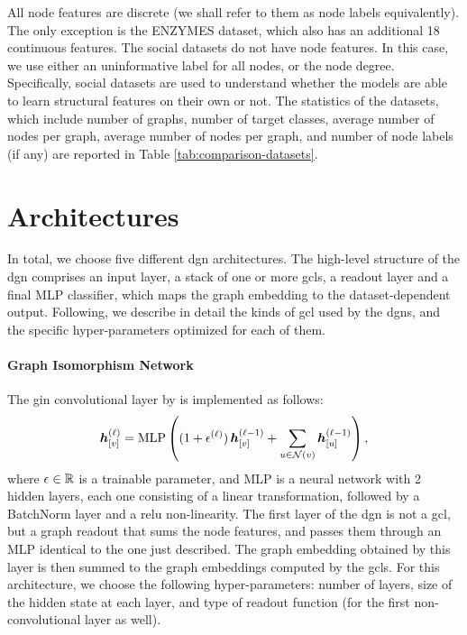 All node features are discrete (we shall refer to them as node labels equivalently). The only exception is the ENZYMES dataset, which also has an additional 18 continuous features. The social datasets do not have node features. In this case, we use either an uninformative label for all nodes, or the node degree. Specifically, social datasets are used to understand whether the models are able to learn structural features on their own or not. The statistics of the datasets, which include number of graphs, number of target classes, average number of nodes per graph, average number of nodes per graph, and number of node labels (if any) are reported in Table \ref{tab:comparison-datasets}.


\section{Architectures}\label{sec:comparison-architectures}
In total, we choose five different \gls{dgn} architectures. The high-level structure of the \gls{dgn} comprises an input layer, a stack of one or more \glspl{gcl}, a readout layer and a final MLP classifier, which maps the graph embedding to the dataset-dependent output. Following, we describe in detail the kinds of \gls{gcl} used by the \glspl{dgn}, and the specific hyper-parameters optimized for each of them.

\paragraph{Graph Isomorphism Network} The \gls{gin} convolutional layer by \cite{xu2019gin} is implemented as follows:
$$\StateVector{v}{\ell} = \Fun{MLP} \Par{(1 + \epsilon^{(\ell)})\,\Elem{h}{v}^{(\ell-1)} + \sum_{u \in \Neigh(v)} \StateVector{u}{\ell-1}},$$
where $\epsilon \in \mathbb{R}$ is a trainable parameter, and MLP is a neural network with 2 hidden layers, each one consisting of a linear transformation, followed by a BatchNorm layer and a \gls{relu} non-linearity. The first layer of the \gls{dgn} is not a \gls{gcl}, but a graph readout that sums the node features, and passes them through an MLP identical to the one just described. The graph embedding obtained by this layer is then summed to the graph embeddings computed by the \glspl{gcl}. For this architecture, we choose the following hyper-parameters: number of layers, size of the hidden state at each layer, and type of readout function (for the first non-convolutional layer as well).

